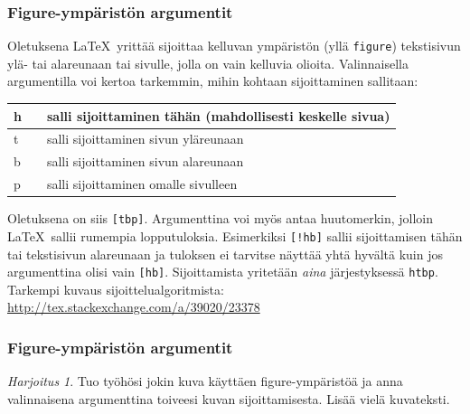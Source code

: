 \documentclass[handout,hyperref={colorlinks=true}]{beamer}
\theoremstyle{remark}
\newtheorem{harj}{Harjoitus}[section]
\begin{document}
\begin{frame}[fragile]
    \frametitle{Figure-ympäristön argumentit}
    Oletuksena \LaTeX\ yrittää sijoittaa kelluvan ympäristön (yllä \verb-figure-) tekstisivun ylä- tai alareunaan tai sivulle, jolla on vain kelluvia olioita. Valinnaisella argumentilla voi kertoa tarkemmin, mihin kohtaan sijoittaminen sallitaan:
    \begin{table}
        \begin{tabular}{lcl}

            h && salli sijoittaminen tähän (mahdollisesti keskelle sivua)\\
            \hline
            t && salli sijoittaminen sivun yläreunaan\\
            \hline
            b && salli sijoittaminen sivun alareunaan\\
            \hline
            p && salli sijoittaminen omalle sivulleen

        \end{tabular}
    \end{table}
    Oletuksena on siis \verb-[tbp]-. Argumenttina voi myös antaa huutomerkin, jolloin \LaTeX\ sallii rumempia lopputuloksia. Esimerkiksi \verb-[!hb]- sallii sijoittamisen tähän tai tekstisivun alareunaan ja tuloksen ei tarvitse näyttää yhtä hyvältä kuin jos argumenttina olisi vain \verb-[hb]-. Sijoittamista yritetään \emph{aina} järjestyksessä \verb-htbp-. Tarkempi kuvaus sijoittelualgoritmista: \url{http://tex.stackexchange.com/a/39020/23378}

\end{frame}
\begin{frame}[fragile]
    \frametitle{Figure-ympäristön argumentit}
    \begin{harj}
        Tuo työhösi jokin kuva käyttäen figure-ympäristöä ja anna valinnaisena argumenttina toiveesi kuvan sijoittamisesta. Lisää vielä kuvateksti.
    \end{harj}
\end{frame}
\end{document}

